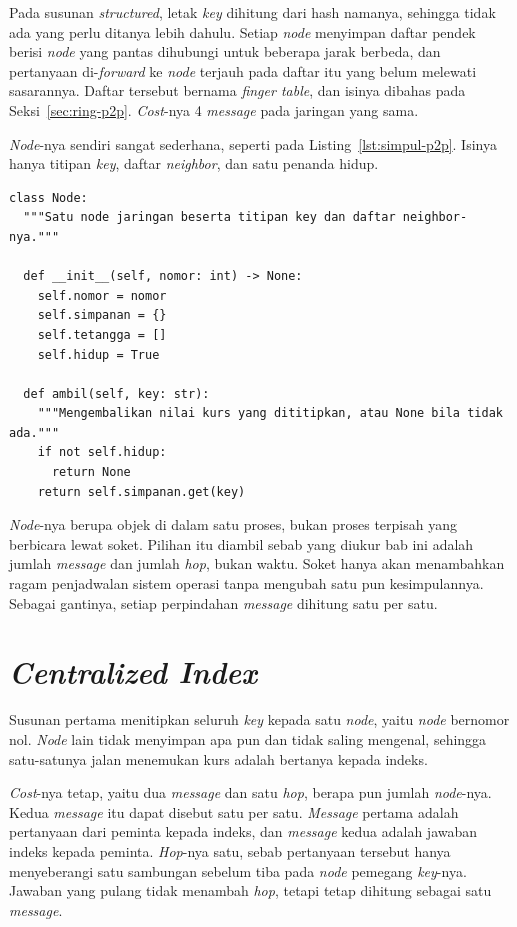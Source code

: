 Pada susunan \textit{structured}, letak \textit{key} dihitung dari hash namanya,
sehingga tidak ada yang perlu ditanya lebih dahulu. Setiap \textit{node}
menyimpan daftar pendek berisi \textit{node} yang pantas dihubungi untuk
beberapa jarak berbeda, dan pertanyaan di-\textit{forward} ke \textit{node} terjauh pada
daftar itu yang belum melewati sasarannya. Daftar tersebut bernama
\textit{finger table}, dan isinya dibahas pada
Seksi~\ref{sec:ring-p2p}.
\textit{Cost}-nya 4 \textit{message} pada jaringan yang sama.

\textit{Node}-nya sendiri sangat sederhana, seperti pada
Listing~\ref{lst:simpul-p2p}. Isinya hanya titipan \textit{key}, daftar
\textit{neighbor}, dan satu penanda hidup.

\begin{lstlisting}[style=PythonStyle, caption={Satu \textit{node} jaringan,
  tersedia di \berkas{sources/chapter07/jaringan.py}}, label=lst:simpul-p2p]
class Node:
  """Satu node jaringan beserta titipan key dan daftar neighbor-nya."""

  def __init__(self, nomor: int) -> None:
    self.nomor = nomor
    self.simpanan = {}
    self.tetangga = []
    self.hidup = True

  def ambil(self, key: str):
    """Mengembalikan nilai kurs yang dititipkan, atau None bila tidak ada."""
    if not self.hidup:
      return None
    return self.simpanan.get(key)
\end{lstlisting}

\textit{Node}-nya berupa objek di dalam satu proses, bukan proses terpisah
yang berbicara lewat soket. Pilihan itu diambil sebab yang diukur bab ini adalah
jumlah \textit{message} dan jumlah \textit{hop}, bukan waktu. Soket hanya akan menambahkan
ragam penjadwalan sistem operasi tanpa mengubah satu pun kesimpulannya. Sebagai
gantinya, setiap perpindahan \textit{message} dihitung satu per satu.

\section{\textit{Centralized Index}}

Susunan pertama menitipkan seluruh \textit{key} kepada satu \textit{node}, yaitu \textit{node}
bernomor nol. \textit{Node} lain tidak menyimpan apa pun dan tidak saling mengenal,
sehingga satu-satunya jalan menemukan kurs adalah bertanya kepada indeks.

\textit{Cost}-nya tetap, yaitu dua \textit{message} dan satu \textit{hop}, berapa pun jumlah
\textit{node}-nya. Kedua \textit{message} itu dapat disebut satu per satu. \textit{Message} pertama
adalah pertanyaan dari peminta kepada indeks, dan \textit{message} kedua adalah jawaban
indeks kepada peminta. \textit{Hop}-nya satu, sebab pertanyaan tersebut hanya
menyeberangi satu sambungan sebelum tiba pada \textit{node} pemegang \textit{key}-nya.
Jawaban yang pulang tidak menambah \textit{hop}, tetapi tetap dihitung sebagai
satu \textit{message}.

